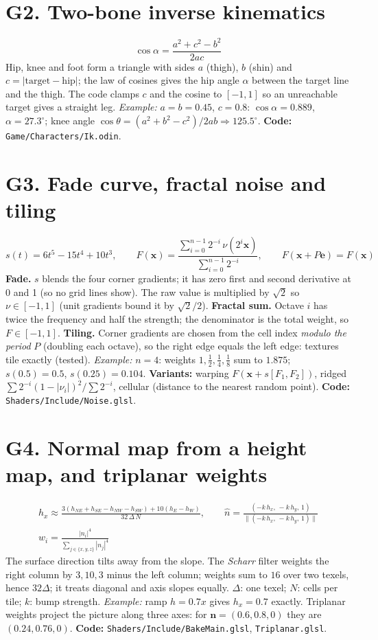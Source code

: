 \documentclass[11pt,a4paper]{article}
\newcommand{\code}[1]{{\small\texttt{#1}}}
\begin{document}
\section{G2. Two-bone inverse kinematics}
\[\cos\alpha=\frac{a^{2}+c^{2}-b^{2}}{2ac}\]
Hip, knee and foot form a triangle with sides $a$ (thigh), $b$ (shin) and $c=|\text{target}-\text{hip}|$; the law of cosines gives the hip angle $\alpha$ between the target line and the thigh. The code clamps $c$ and the cosine to $[-1,1]$ so an unreachable target gives a straight leg. \emph{Example:} $a=b=0.45$, $c=0.8$: $\cos\alpha=0.889$, $\alpha=27.3^{\circ}$; knee angle $\cos\theta=(a^2+b^2-c^2)/2ab\Rightarrow125.5^{\circ}$. \textbf{Code:} \code{Game/Characters/Ik.odin}.

\section{G3. Fade curve, fractal noise and tiling}
\[s(t)=6t^{5}-15t^{4}+10t^{3},\qquad F(\mathbf x)=\frac{\displaystyle\sum\limits_{i=0}^{n-1}2^{-i}\,\nu\!\left(2^{i}\mathbf x\right)}{\displaystyle\sum\limits_{i=0}^{n-1}2^{-i}},\qquad F(\mathbf x+P\mathbf e)=F(\mathbf x)\]
\textbf{Fade.} $s$ blends the four corner gradients; it has zero first and second derivative at 0 and 1 (so no grid lines show). The raw value is multiplied by $\sqrt2$ so $\nu\in[-1,1]$ (unit gradients bound it by $\sqrt2/2$). \textbf{Fractal sum.} Octave $i$ has twice the frequency and half the strength; the denominator is the total weight, so $F\in[-1,1]$. \textbf{Tiling.} Corner gradients are chosen from the cell index \emph{modulo the period} $P$ (doubling each octave), so the right edge equals the left edge: textures tile exactly (tested). \emph{Example:} $n=4$: weights $1,\tfrac12,\tfrac14,\tfrac18$ sum to $1.875$; $s(0.5)=0.5$, $s(0.25)=0.104$. \textbf{Variants:} warping $F(\mathbf x+s[F_1,F_2])$, ridged $\sum2^{-i}(1-|\nu_i|)^2/\sum2^{-i}$, cellular (distance to the nearest random point). \textbf{Code:} \code{Shaders/Include/Noise.glsl}.

\section{G4. Normal map from a height map, and triplanar weights}
\[\begin{gathered}h_x\approx\frac{3(h_{NE}+h_{SE}-h_{NW}-h_{SW})+10(h_E-h_W)}{32\,\Delta\,N},\qquad \hat n=\frac{(-k\,h_x,\,-k\,h_y,\,1)}{\lVert(-k\,h_x,\,-k\,h_y,\,1)\rVert}\\[6pt] w_i=\frac{|n_i|^{4}}{\displaystyle\sum\limits_{j\in\{x,y,z\}}|n_j|^{4}}\end{gathered}\]
The surface direction tilts away from the slope. The \emph{Scharr} filter weights the right column by $3,10,3$ minus the left column; weights sum to $16$ over two texels, hence $32\Delta$; it treats diagonal and axis slopes equally. $\Delta$: one texel; $N$: cells per tile; $k$: bump strength. \emph{Example:} ramp $h=0.7x$ gives $h_x=0.7$ exactly. Triplanar weights project the picture along three axes: for $\mathbf n=(0.6,0.8,0)$ they are $(0.24,0.76,0)$. \textbf{Code:} \code{Shaders/Include/BakeMain.glsl}, \code{Triplanar.glsl}.
\end{document}
